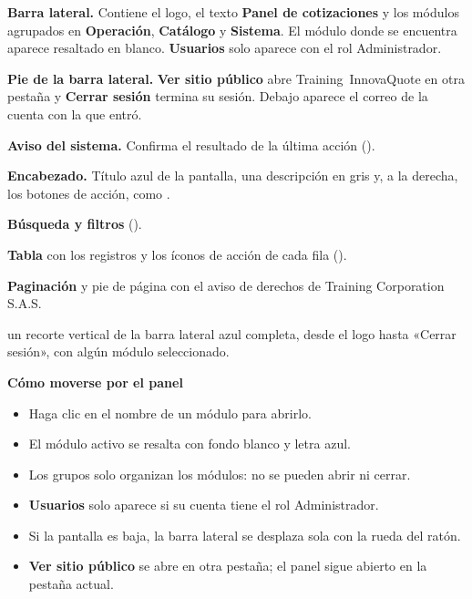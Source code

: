 \begin{zonas}
  \item \textbf{Barra lateral.} Contiene el logo, el texto \textbf{Panel de cotizaciones} y los
        módulos agrupados en \textbf{Operación}, \textbf{Catálogo} y \textbf{Sistema}. El módulo
        donde se encuentra aparece resaltado en blanco. \textbf{Usuarios} solo aparece con el rol
        Administrador.
  \item \textbf{Pie de la barra lateral.} \textbf{Ver sitio público} abre Training~InnovaQuote en otra
        pestaña y \textbf{Cerrar sesión} termina su sesión. Debajo aparece el correo de la cuenta
        con la que entró.
  \item \textbf{Aviso del sistema.} Confirma el resultado de la última acción
        ().
  \item \textbf{Encabezado.} Título azul de la pantalla, una descripción en gris y, a la
        derecha, los botones de acción, como .
  \item \textbf{Búsqueda y filtros} ().
  \item \textbf{Tabla} con los registros y los íconos de acción de cada fila
        ().
  \item \textbf{Paginación} y pie de página con el aviso de derechos de Training Corporation S.A.S.
\end{zonas}

  {un recorte vertical de la barra lateral azul completa, desde el logo hasta «Cerrar sesión»,
   con algún módulo seleccionado.}
  {\textbf{Cómo moverse por el panel}

   \begin{itemize}
     \item Haga clic en el nombre de un módulo para abrirlo.
     \item El módulo activo se resalta con fondo blanco y letra azul.
     \item Los grupos solo organizan los módulos: no se pueden abrir ni cerrar.
     \item \textbf{Usuarios} solo aparece si su cuenta tiene el rol Administrador.
     \item Si la pantalla es baja, la barra lateral se desplaza sola con la rueda del ratón.
     \item \textbf{Ver sitio público} se abre en otra pestaña; el panel sigue abierto en la
           pestaña actual.
   \end{itemize}}


